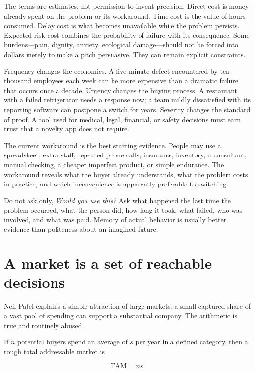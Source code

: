 The terms are estimates, not permission to invent precision. Direct cost is
money already spent on the problem or its workaround. Time cost is the value of
hours consumed. Delay cost is what becomes unavailable while the problem
persists. Expected risk cost combines the probability of failure with its
consequence. Some burdens---pain, dignity, anxiety, ecological damage---should
not be forced into dollars merely to make a pitch persuasive. They can remain
explicit constraints.

Frequency changes the economics. A five-minute defect encountered by ten
thousand employees each week can be more expensive than a dramatic failure
that occurs once a decade. Urgency changes the buying process. A restaurant
with a failed refrigerator needs a response now; a team mildly dissatisfied
with its reporting software can postpone a switch for years. Severity changes
the standard of proof. A tool used for medical, legal, financial, or safety
decisions must earn trust that a novelty app does not require.

The current workaround is the best starting evidence. People may use a
spreadsheet, extra staff, repeated phone calls, insurance, inventory, a
consultant, manual checking, a cheaper imperfect product, or simple endurance.
The workaround reveals what the buyer already understands, what the problem
costs in practice, and which inconvenience is apparently preferable to
switching.

Do not ask only, \emph{Would you use this?} Ask what happened the last time the
problem occurred, what the person did, how long it took, what failed, who was
involved, and what was paid. Memory of actual behavior is usually better
evidence than politeness about an imagined future.

\section{A market is a set of reachable decisions}

Neil Patel explains a simple attraction of large markets: a small captured
share of a vast pool of spending can support a substantial company. The
arithmetic is true and routinely abused.

If $n$ potential buyers spend an average of $s$ per year in a defined category,
then a rough total addressable market is

\begin{equation}
\mathrm{TAM} = n s.
\end{equation}

